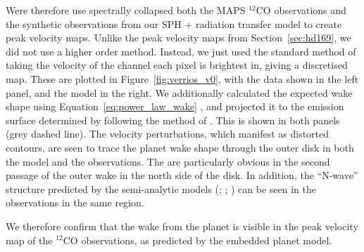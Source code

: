 Were therefore use spectrally collapsed both the MAPS $^{12}$CO observations \citep{oberg2021} and the synthetic observations from our SPH + radiation transfer model to create peak velocity maps.
Unlike the peak velocity maps from Section~\ref{sec:hd169}, we did not use a higher order method.
Instead, we just used the standard method \citep[e.g.][]{thecasateam2022} of taking the velocity of the channel each pixel is brightest in, giving a discretised map.
These are plotted in Figure~\ref{fig:verrios_v0}, with the data shown in the left panel, and the model in the right.
We additionally calculated the expected wake shape using Equation~\eqref{eq:power_law_wake} \citep{ogilvie2002,rafikov2002a}, and projected it to the emission surface determined by \citet{law2021a} following the method of \citet{calcino2022}.
This is shown in both panels (grey dashed line).
The velocity perturbations, which manifest as distorted contours, are seen to trace the planet wake shape through the outer disk in both the model and the observations.
The are particularly obvious in the second passage of the outer wake in the north side of the disk.
In addition, the ``N-wave'' structure predicted by the semi-analytic models (\citealt{goodman2001}; \citealt{rafikov2002a}; ) can be seen in the observations in the same region.

We therefore confirm that the wake from the planet is visible in the peak velocity map of the $^{12}$CO observations, as predicted by the embedded planet model.